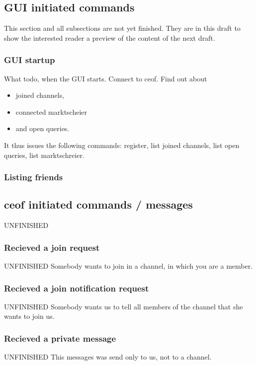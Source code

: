 \documentclass[12pt,a4paper]{book}
\begin{document}
\subsection{GUI initiated commands}
This section and all subsections are not yet finished. They
are in this draft to show the interested reader a preview of the
content of the next draft.
\subsubsection{GUI startup}
What todo, when the GUI starts.
Connect to ceof. Find out about
\begin{itemize}
\item joined channels,
\item connected marktscheier
\item and open queries.
\end{itemize}
It thus issues the following commands:
register, list joined channels, list open queries, list marktschreier.
\subsubsection{Listing friends}
\subsection{ceof initiated commands / messages}
UNFINISHED
\subsubsection{Recieved a join request}
UNFINISHED
Somebody wants to join in a channel, in which you are a member.
\subsubsection{Recieved a join notification request}
UNFINISHED
Somebody wants us to tell all members of the channel that she wants to join us.
\subsubsection{Recieved a private message}
UNFINISHED
This messages was send only to us, not to a channel.
\end{document}
